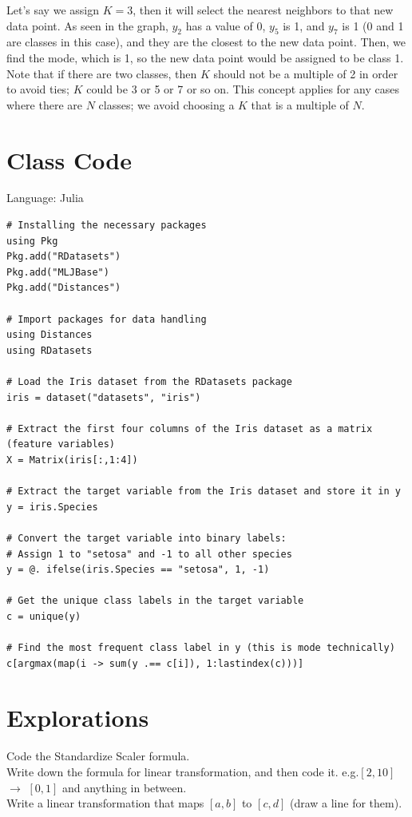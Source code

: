 Let's say we assign $K = 3$, then it will select the nearest neighbors to that new data point.
As seen in the graph, $y_2$ has a value of 0, $y_5$ is 1, and $y_7$ is 1 (0 and 1 are classes in this case), and
they are the closest to the new data point. Then, we find the mode, which is 1, so
the new data point would be assigned to be class 1.\\
Note that if there are two classes, then $K$ should not be a multiple of 2 in order to avoid ties; $K$ could be
3 or 5 or 7 or so on. This concept applies for any cases where there are $N$ classes; we avoid choosing a $K$ that is a multiple of $N$.

\section{Class Code}
Language: Julia
\begin{verbatim}
# Installing the necessary packages
using Pkg
Pkg.add("RDatasets")
Pkg.add("MLJBase")
Pkg.add("Distances")

# Import packages for data handling
using Distances
using RDatasets

# Load the Iris dataset from the RDatasets package
iris = dataset("datasets", "iris")

# Extract the first four columns of the Iris dataset as a matrix (feature variables)
X = Matrix(iris[:,1:4])

# Extract the target variable from the Iris dataset and store it in y
y = iris.Species

# Convert the target variable into binary labels:  
# Assign 1 to "setosa" and -1 to all other species  
y = @. ifelse(iris.Species == "setosa", 1, -1)

# Get the unique class labels in the target variable
c = unique(y)

# Find the most frequent class label in y (this is mode technically)
c[argmax(map(i -> sum(y .== c[i]), 1:lastindex(c)))]
\end{verbatim}

\section{Explorations}
\begin{outline}
    \1  Code the Standardize Scaler formula. \\
    \1  Write down the formula for linear transformation, and then code it. e.g.$[2,10]$ $\rightarrow$ $[0,1]$ and anything in between.\\
    \1 Write a linear transformation that maps $[a,b]$ to $[c,d]$ (draw a line for them). \\
    

\end{outline}



